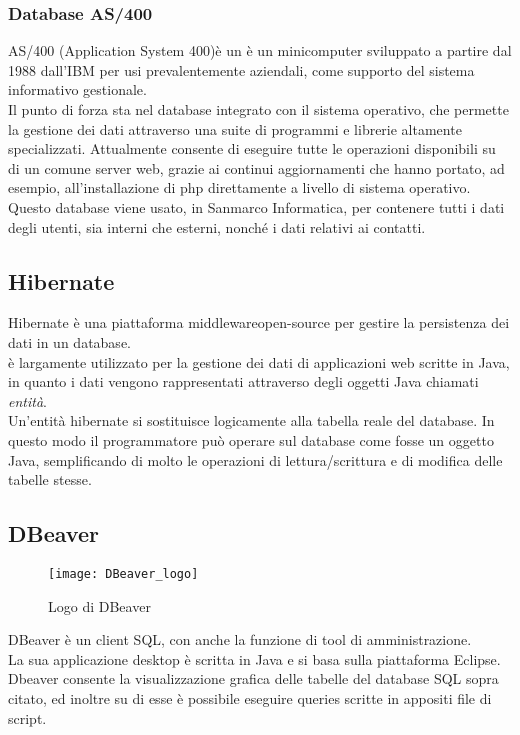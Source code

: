 \subsubsection{Database AS/400}
AS/400 (Application System 400)è un è un minicomputer sviluppato a partire dal 1988 dall’IBM per usi prevalentemente aziendali, come supporto del sistema informativo gestionale.\\
Il punto di forza sta nel database integrato con il sistema operativo, che permette la gestione dei dati attraverso una suite di programmi e librerie altamente specializzati. Attualmente consente di eseguire tutte le operazioni disponibili su di un comune server web, grazie ai continui aggiornamenti che hanno portato, ad esempio, all'installazione di \gls{php} direttamente a livello di sistema operativo.
Questo database viene usato, in Sanmarco Informatica, per contenere tutti i dati degli utenti, sia interni che esterni, nonché i dati relativi ai contatti. %
\subsection{Hibernate}
Hibernate è una piattaforma \gls{middleware}\glsfirstoccur open-source per gestire la persistenza dei dati in un database.\\
è largamente utilizzato per la gestione dei dati di applicazioni web scritte in Java, in quanto i dati vengono rappresentati attraverso degli oggetti Java chiamati \emph{entità}.\\
Un'entità hibernate si sostituisce logicamente alla tabella reale del database. In questo modo il programmatore può operare sul database come fosse un oggetto Java, semplificando di molto le operazioni di lettura/scrittura e di modifica delle tabelle stesse.\\

\newpage

\subsection{DBeaver}

\begin{figure}[h]
	\centering
	\texttt{[image: DBeaver\_logo]}
	\caption{Logo di DBeaver}
\end{figure}
DBeaver è un client SQL, con anche la funzione di tool di amministrazione.\\
La sua applicazione desktop è scritta in Java e si basa sulla piattaforma Eclipse.\\
Dbeaver consente la visualizzazione grafica delle tabelle del database SQL sopra citato, ed inoltre su di esse è possibile eseguire queries scritte in appositi file di script.\\
